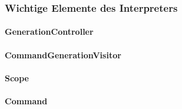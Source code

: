 \documentclass[parskip=full]{scrartcl}
\begin{document}
\subsubsection{Wichtige Elemente des Interpreters}
\paragraph{GenerationController}
\paragraph{CommandGenerationVisitor}
\paragraph{Scope}
\paragraph{Command}
\end{document}
